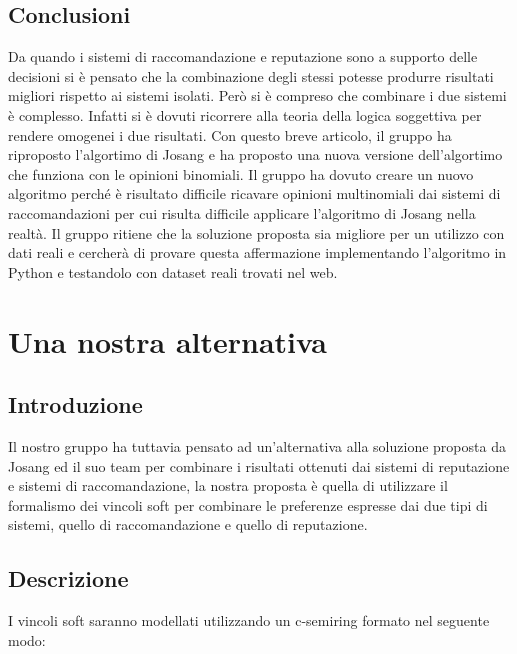 \documentclass{report}
\begin{document}
	\hypertarget{header-n223}{%
		\subsection{Conclusioni}\label{header-n223}}
	
	Da quando i sistemi di raccomandazione e reputazione sono a supporto
	delle decisioni si è pensato che la combinazione degli stessi potesse
	produrre risultati migliori rispetto ai sistemi isolati. Però si è
	compreso che combinare i due sistemi è complesso. Infatti si è dovuti
	ricorrere alla teoria della logica soggettiva per rendere omogenei i due
	risultati. Con questo breve articolo, il gruppo ha riproposto
	l'algortimo di Josang e ha proposto una nuova versione dell'algortimo
	che funziona con le opinioni binomiali. Il gruppo ha dovuto creare un
	nuovo algoritmo perché è risultato difficile ricavare opinioni
	multinomiali dai sistemi di raccomandazioni per cui risulta difficile
	applicare l'algoritmo di Josang nella realtà. Il gruppo ritiene che la
	soluzione proposta sia migliore per un utilizzo con dati reali e
	cercherà di provare questa affermazione implementando l'algoritmo in
	Python e testandolo con dataset reali trovati nel web.
	
	\hypertarget{header-n226}{%
		\section{Una nostra alternativa}\label{header-n226}}
	
	\hypertarget{header-n227}{%
		\subsection{Introduzione}\label{header-n227}}
	
	Il nostro gruppo ha tuttavia pensato ad un'alternativa alla soluzione
	proposta da Josang ed il suo team per combinare i risultati ottenuti dai
	sistemi di reputazione e sistemi di raccomandazione, la nostra proposta
	è quella di utilizzare il formalismo dei vincoli soft per combinare le
	preferenze espresse dai due tipi di sistemi, quello di raccomandazione e
	quello di reputazione.
	
	\hypertarget{header-n230}{%
		\subsection{Descrizione}\label{header-n230}}
	
	I vincoli soft saranno modellati utilizzando un c-semiring formato nel
	seguente modo:
	
\end{document}
